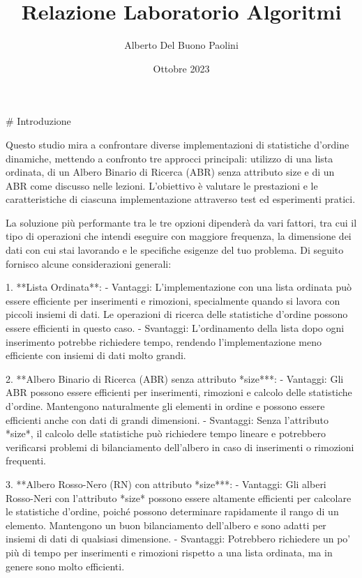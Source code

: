 \documentclass[twocolumn]{article}
\title{Relazione Laboratorio Algoritmi}
\author{Alberto Del Buono Paolini}
\date{Ottobre 2023}
\begin{document}
\begin{onecolumn}
\maketitle
\tableofcontents
\vspace{10cm}
\end{onecolumn}
\pagebreak


\begin{markdown}
# Introduzione

Questo studio mira a confrontare diverse implementazioni di statistiche d'ordine dinamiche, mettendo a confronto tre approcci principali: utilizzo di una lista ordinata, di un Albero Binario di Ricerca (ABR) senza attributo size e di un ABR come discusso nelle lezioni. L'obiettivo è valutare le prestazioni e le caratteristiche di ciascuna implementazione attraverso test ed esperimenti pratici.

La soluzione più performante tra le tre opzioni dipenderà da vari fattori, tra cui il tipo di operazioni che intendi eseguire con maggiore frequenza, la dimensione dei dati con cui stai lavorando e le specifiche esigenze del tuo problema. Di seguito fornisco alcune considerazioni generali:

1. **Lista Ordinata**:
       - Vantaggi: L'implementazione con una lista ordinata può essere efficiente per inserimenti e rimozioni, specialmente quando si lavora con piccoli insiemi di dati. Le operazioni di ricerca delle statistiche d'ordine possono essere efficienti in questo caso.
       - Svantaggi: L'ordinamento della lista dopo ogni inserimento potrebbe richiedere tempo, rendendo l'implementazione meno efficiente con insiemi di dati molto grandi.

2. **Albero Binario di Ricerca (ABR) senza attributo *size***:
       - Vantaggi: Gli ABR possono essere efficienti per inserimenti, rimozioni e calcolo delle statistiche d'ordine. Mantengono naturalmente gli elementi in ordine e possono essere efficienti anche con dati di grandi dimensioni.
       - Svantaggi: Senza l'attributo *size*, il calcolo delle statistiche può richiedere tempo lineare e potrebbero verificarsi problemi di bilanciamento dell'albero in caso di inserimenti o rimozioni frequenti.

3. **Albero Rosso-Nero (RN) con attributo *size***:
       - Vantaggi: Gli alberi Rosso-Neri con l'attributo *size* possono essere altamente efficienti per calcolare le statistiche d'ordine, poiché possono determinare rapidamente il rango di un elemento. Mantengono un buon bilanciamento dell'albero e sono adatti per insiemi di dati di qualsiasi dimensione.
       - Svantaggi: Potrebbero richiedere un po' più di tempo per inserimenti e rimozioni rispetto a una lista ordinata, ma in genere sono molto efficienti.


\end{markdown}
\end{document}
